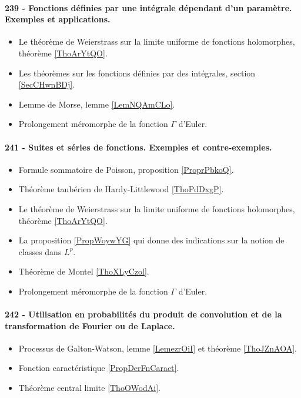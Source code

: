 \paragraph{239 - Fonctions définies par une intégrale dépendant d’un paramètre. Exemples et applications.}
\begin{itemize}
    \item Le théorème de Weierstrass sur la limite uniforme de fonctions holomorphes, théorème \ref{ThoArYtQO}.
    \item Les théorèmes sur les fonctions définies par des intégrales, section \ref{SecCHwnBDj}.
    \item Lemme de Morse, lemme \ref{LemNQAmCLo}.
    \item Prolongement méromorphe de la fonction \( \Gamma\) d'Euler.
\end{itemize}
\paragraph{241 - Suites et séries de fonctions. Exemples et contre-exemples.}
\begin{itemize}
    \item Formule sommatoire de Poisson, proposition \ref{ProprPbkoQ}.
    \item Théorème taubérien de Hardy-Littlewood \ref{ThoPdDxgP}.
    \item Le théorème de Weierstrass sur la limite uniforme de fonctions holomorphes, théorème \ref{ThoArYtQO}.
    \item La proposition \ref{PropWoywYG} qui donne des indications sur la notion de classes dans \( L^p\).
    \item Théorème de Montel \ref{ThoXLyCzol}.
    \item Prolongement méromorphe de la fonction \( \Gamma\) d'Euler.
\end{itemize}
\paragraph{242 - Utilisation en probabilités du produit de convolution et de la transformation de Fourier ou de Laplace.}
\begin{itemize}
    \item Processus de Galton-Watson, lemme \ref{LemezrOiI} et théorème \ref{ThoJZnAOA}.
    \item Fonction caractéristique \ref{PropDerFnCaract}.
    \item Théorème central limite \ref{ThoOWodAi}.
\end{itemize}

